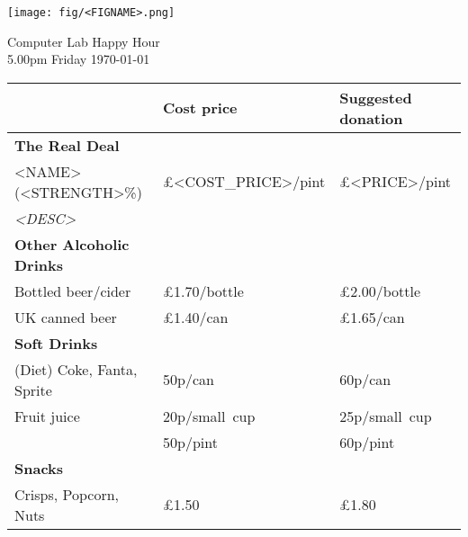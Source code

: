 \documentclass[a4paper,12pt]{article}
\begin{document}
\thispagestyle{empty}

\begin{center}
	\texttt{[image: fig/<FIGNAME>.png]} \par \bigskip \bigskip \bigskip
    {\Large Computer Lab Happy Hour} \\ \smallskip
    {5.00pm Friday \today}
\end{center}

\bigskip

\large
\begin{center}

\def\arraystretch{1.1}

\begin{tabular}{p{7.5cm}|p{3cm}|p{3cm}} & \textbf{Cost price} & \textbf{Suggested donation} \\
\hline
\textbf{The Real Deal} & & \\
<NAME> (<STRENGTH>\%) & \pounds <COST_PRICE>/pint & \pounds <PRICE>/pint \\
\small \it <DESC> \medskip & & \\

\hline
{\bf Other Alcoholic Drinks} & & \\
Bottled beer/cider & \pounds 1.70/bottle & \pounds 2.00/bottle \\
UK canned beer & \pounds 1.40/can & \pounds 1.65/can \medskip \\

\hline
{\bf Soft Drinks} &&\\
(Diet) Coke, Fanta, Sprite & 50p/can  & 60p/can \medskip\\
Fruit juice & 20p/small~cup & 25p/small~cup \\
& 50p/pint & 60p/pint \medskip \\

\hline
{\bf Snacks} & & \\
Crisps, Popcorn, Nuts &\pounds 1.50 &\pounds 1.80 \\

\end{tabular}
\end{center}
\end{document}
